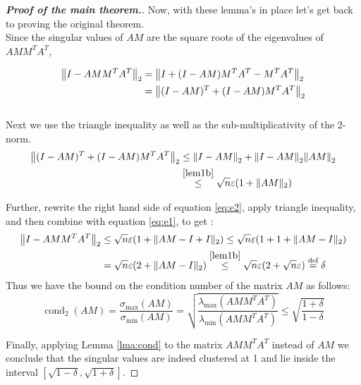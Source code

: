 \documentclass[paper=A4, fontsize=11pt]{scrartcl}
\let\originalleft\left
\let\originalright\right
\renewcommand{\left}{\mathopen{}\mathclose\bgroup\originalleft}
\renewcommand{\right}{\aftergroup\egroup\originalright}
\theoremstyle{remark}
\begin{document}
\vspace{2em}
\begin{proof}[\textbf{Proof of the main theorem.}] 

Now, with these lemma's in place let's get back to proving the original theorem. \\

Since the singular values of $AM$ are the square roots of the eigenvalues of $A M M^{T} A^{T} $, 


\begin{align}\label{eq:e1}
\left\|I-A M M^{T} A^{T}\right\|_{2} &= \left\|I+(I-A M) M^{T} A^{T}-M^{T} A^{T}\right\|_{2} \\ & =\left\|(I-A M)^{T} + (I-A M)M^{T}A^{T}\right\|_{2}
\end{align}
\\
Next we use the triangle inequality as well as the sub-multiplicativity of the 2-norm.
\\
\begin{align}\label{eq:e2}
\left\|(I-A M)^{T} + (I-A M)M^{T}A^{T}\right\|_{2}
& \leq \left\|I-A M\right\|_{2} + \left\|I-A M\right\|_{2}\left\|AM\right\|_{2} \\
& \overset{\eqref{lem1b}}{\leq} \sqrt{n} \varepsilon\left(1+\|A M\|_{2}\right)
\end{align}

Further, rewrite the right hand side of equation \eqref{eq:e2}, apply triangle inequality, and then combine with equation \eqref{eq:e1}, to get : 
\begin{align}
\left\|I-A M M^{T} A^{T}\right\|_{2} & \leq \sqrt{n} \varepsilon\left(1+\|A M-I+I\|_{2}\right) \leq \sqrt{n} \varepsilon\left(1+1+\|A M-I\|_{2}\right) \\
&= \sqrt{n} \varepsilon\left(2 +\|A M-I\|_{2}\right)  \overset{\eqref{lem1b}}{\leq} \sqrt{n} \varepsilon(2+\sqrt{n} \varepsilon) \overset{\text{def}}{=} \delta
\end{align}
Thus we have the bound on the condition number of the matrix $AM$ as follows: 
\begin{equation}
\operatorname{cond}_{2}(A M) = \frac{\sigma_{\text{max}}(AM)}{\sigma_{\text{min}}(AM)} =  \sqrt{\frac{\lambda_{\text{max}}(AM M^{T} A^{T})}{\lambda_{\text{min}}(AM M^{T} A^{T})}} \leq \sqrt{\frac{1+\delta}{1-\delta}}
\end{equation}

Finally, applying Lemma \ref{lma:cond} to the matrix $ A M M^{T} A^{T} $ instead of $ A M$ we conclude that the singular values are indeed clustered at 1 and lie inside the interval \([\sqrt{1-\delta}, \sqrt{1+\delta}]\).
\end{proof}
\end{document}

